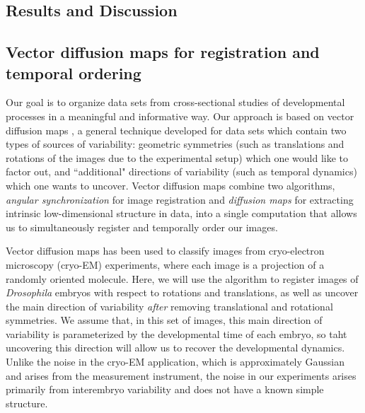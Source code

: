 \documentclass{pnastwo}
\begin{document}
\begin{article}
\section{Results and Discussion}

\subsection{Vector diffusion maps for registration and temporal ordering}

%
Our goal is to organize data sets from cross-sectional studies of developmental processes in a meaningful and informative way.
%
%
Our approach is based on vector diffusion maps \cite{singer2012vector}, a general technique developed for data sets which contain two types of sources of variability:
geometric symmetries (such as translations and rotations of the images due to the experimental setup) which one would like to factor out, 
and ``additional" directions of variability (such as temporal dynamics) which one wants to uncover.
%
Vector diffusion maps combine two algorithms, {\em angular synchronization} \cite{singer2011angular} for image registration and {\em diffusion maps} \cite{coifman2005geometric} for extracting intrinsic low-dimensional structure in data, into a single computation that allows us to simultaneously register and temporally order our images.
%

Vector diffusion maps has been used to classify images from cryo-electron microscopy (cryo-EM) experiments, where each image is a projection of a randomly oriented molecule.
%
Here, we will use the algorithm to register images of {\it Drosophila} embryos with respect to rotations and translations, as well as uncover the main direction of variability {\it after} removing translational and rotational symmetries.
%
We assume that, in this set of images, this main direction of variability is parameterized by the developmental time of each embryo, so taht uncovering this direction will allow us to recover the developmental dynamics.
%
Unlike the noise in the cryo-EM application, which is approximately Gaussian and arises from the measurement instrument, the noise in our experiments arises primarily from interembryo variability and does not have a known simple structure.


\end{article}
\end{document}

